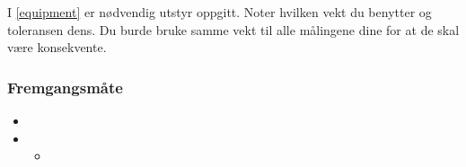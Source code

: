 	I \vref{equipment} er nødvendig utstyr oppgitt.	Noter hvilken vekt du benytter og toleransen dens.
	Du burde bruke samme vekt til alle målingene dine for at de skal være konsekvente.
	
	\subsubsection{Fremgangsmåte}
	\begin{itemize}
		\item 
		
		\item 
		\begin{itemize}
			\item 
		\end{itemize}		
	\end{itemize}	
	
	
	
